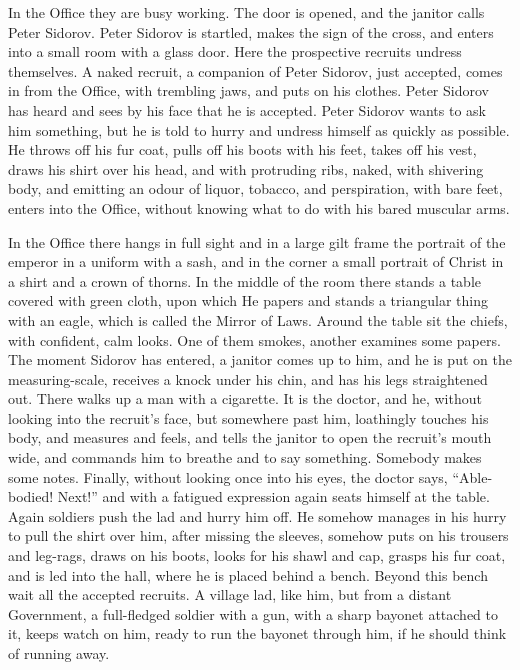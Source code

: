 \documentclass{book}
\begin{document}
In the Office they are busy working. The door is opened, and the janitor calls Peter Sidorov. Peter Sidorov is startled, makes the sign of the cross, and enters into a small room with a glass door. Here the prospective recruits undress themselves. A naked recruit, a companion of Peter Sidorov, just accepted, comes in from the Office, with trembling jaws, and puts on his clothes. Peter Sidorov has heard and sees by his face that he is accepted. Peter Sidorov wants to ask him something, but he is told to hurry and undress himself as quickly as possible. He throws off his fur coat, pulls off his boots with his feet, takes off his vest, draws his shirt over his head, and with protruding ribs, naked, with shivering body, and emitting an odour of liquor, tobacco, and perspiration, with bare feet, enters into the Office, without knowing what to do with his bared muscular arms.

In the Office there hangs in full sight and in a large gilt frame the portrait of the emperor in a uniform with a sash, and in the corner a small portrait of Christ in a shirt and a crown of thorns. In the middle of the room there stands a table covered with green cloth, upon which He papers and stands a triangular thing with an eagle, which is called the Mirror of Laws. Around the table sit the chiefs, with confident, calm looks. One of them smokes, another examines some papers. The moment Sidorov has entered, a janitor comes up to him, and he is put on the measuring-scale, receives a knock under his chin, and has his legs straightened out. There walks up a man with a cigarette. It is the doctor, and he, without looking into the recruit’s face, but somewhere past him, loathingly touches his body, and measures and feels, and tells the janitor to open the recruit’s mouth wide, and commands him to breathe and to say something. Somebody makes some notes. Finally, without looking once into his eyes, the doctor says, “Able-bodied! Next!” and with a fatigued expression again seats himself at the table. Again soldiers push the lad and hurry him off. He somehow manages in his hurry to pull the shirt over him, after missing the sleeves, somehow puts on his trousers and leg-rags, draws on his boots, looks for his shawl and cap, grasps his fur coat, and is led into the hall, where he is placed behind a bench. Beyond this bench wait all the accepted recruits. A village lad, like him, but from a distant Government, a full-fledged soldier with a gun, with a sharp bayonet attached to it, keeps watch on him, ready to run the bayonet through him, if he should think of running away.
\end{document}
